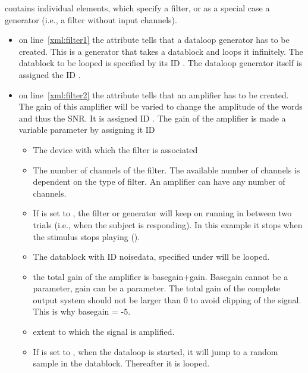  contains individual  elements,
which specify a filter, or as a special case a generator (i.e., a
filter without input channels).
\begin{itemize}

\item {} on line~\ref{xml:filter1} the attribute
 tells \apex that a dataloop
generator has to be created. This is a generator that takes a
datablock and loops it infinitely. The datablock to be looped is
specified by its ID . The dataloop generator itself
is assigned the ID .


\item {} on line~\ref{xml:filter2} the attribute
 tells \apex that an amplifier has
to be created. The gain of this amplifier will be varied to change
the amplitude of the words and thus the SNR. It is assigned ID
. The gain of the amplifier is made a variable
parameter by assigning it ID 

\begin{itemize}
\item {} The device with which the filter is
associated \item {} The number of channels of the
filter. The available number of channels is dependent on the type
of filter. An amplifier can have any number of channels.

\item If  is set to , the filter or generator
will keep on running in between two trials (i.e., when the subject is responding).
 In this example it stops when the stimulus stops playing ().

\item {} The datablock with ID noisedata,
specified under  will be looped.

\item {} the total gain of the amplifier is
basegain+gain. Basegain cannot be a parameter, gain can be a
parameter. The total gain of the complete output system should not
be larger than 0 to avoid clipping of the signal. This is why
basegain = -5.

\item {} extent to which the signal is amplified.

\item If  is set to , when the dataloop is started, it will jump to a random sample in the datablock. Thereafter it is looped.
\end{itemize}
\end{itemize}

